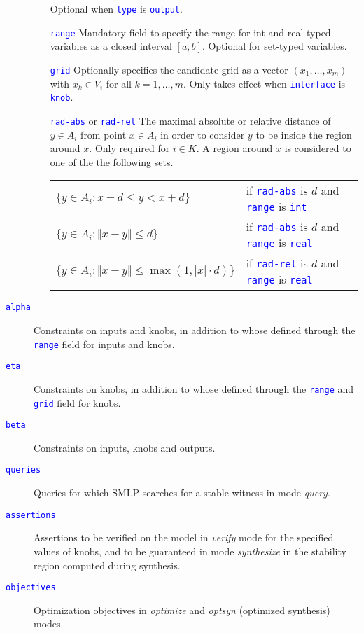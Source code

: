 \documentclass[a4paper,parskip=half]{article} %
\newcommand*\spec[1]{\textcolor{blue}{\texttt{#1}}}
\begin{document}
\begin{description}
\begin{itemize}
	Optional when \spec{type} is \spec{output}.
\item[\spec{range}] 
Mandatory field to specify the range for int and real typed variables as a closed interval $[a, b]$. 
Optional for set-typed variables.
\item[\spec{grid}]
	Optionally specifies the candidate grid as a vector $(x_1,\ldots,x_m)$
	with $x_k\in V_i$ for all $k=1,\ldots,m$.
	Only takes effect when \spec{interface} is \spec{knob}.
\item[\spec{rad-abs} or \spec{rad-rel}]
	The maximal absolute or relative distance of $y\in A_i$ from point $x\in A_i$
	in order to consider $y$ to be inside the region around $x$.
	Only required for $i\in K$.
	A region around $x$ is considered to one of the the following sets.
	\begin{center}
	\begin{tabular}{ll}
		$\{y\in A_i:x-d\leq y<x+d\}$ &
			if \spec{rad-abs} is $d$ and \spec{range} is \spec{int} \\
		$\{y\in A_i:\Vert x-y\Vert\leq d\}$ &
			if \spec{rad-abs} is $d$ and \spec{range} is \spec{real} \\
		$\{y\in A_i:\Vert x-y\Vert\leq\max(1,|x|\cdot d)\}$ &
			if \spec{rad-rel} is $d$ and \spec{range} is \spec{real} \\
	\end{tabular}
	\end{center}
\end{itemize}
\item[\spec{alpha}] Constraints on inputs and knobs, in addition to whose defined through the \spec{range} field for inputs and knobs.
\item[\spec{eta}] Constraints on knobs, in addition to whose defined through the \spec{range} and \spec{grid} field for knobs.
\item[\spec{beta}] Constraints on inputs,  knobs and outputs.
\item[\spec{queries}] Queries for which SMLP searches for a stable witness in mode \emph{query}.
\item[\spec{assertions}] Assertions to be verified on the model in \emph{verify} mode for the specified values of knobs, and to be guaranteed in mode \emph{synthesize} in the stability region computed during synthesis.
\item[\spec{objectives}] Optimization objectives in \emph{optimize} and \emph{optsyn} (optimized synthesis) modes.
\end{description}
\end{document}
